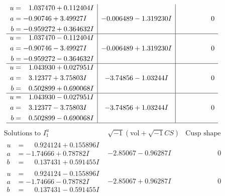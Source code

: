 \documentclass[1p]{elsarticle_modified}
\theoremstyle{definition}
\newcommand{\I}{\sqrt{-1}}
\begin{document}
$$\begin{array}{c|c|c}
\begin{aligned}
u &= \phantom{-}1.037470 + 0.112404 I \\
a &= -0.90746 + 3.49927 I \\
b &= -0.959272 + 0.364632 I\end{aligned}
 & -0.006489 - 1.319230 I & \phantom{-0.000000 } 0 \\ \hline\begin{aligned}
u &= \phantom{-}1.037470 - 0.112404 I \\
a &= -0.90746 - 3.49927 I \\
b &= -0.959272 - 0.364632 I\end{aligned}
 & -0.006489 + 1.319230 I & \phantom{-0.000000 } 0 \\ \hline\begin{aligned}
u &= \phantom{-}1.043930 + 0.027951 I \\
a &= \phantom{-}3.12377 + 3.75803 I \\
b &= \phantom{-}0.502899 + 0.690068 I\end{aligned}
 & -3.74856 - 1.03244 I & \phantom{-0.000000 } 0 \\ \hline\begin{aligned}
u &= \phantom{-}1.043930 - 0.027951 I \\
a &= \phantom{-}3.12377 - 3.75803 I \\
b &= \phantom{-}0.502899 - 0.690068 I\end{aligned}
 & -3.74856 + 1.03244 I & \phantom{-0.000000 } 0\\
 \hline 
 \end{array}$$\newpage$$\begin{array}{c|c|c}  
\text{Solutions to }I^u_{1}& \I (\text{vol} + \sqrt{-1}CS) & \text{Cusp shape}\\
 \hline 
\begin{aligned}
u &= \phantom{-}0.924124 + 0.155896 I \\
a &= -1.74666 + 0.78782 I \\
b &= \phantom{-}0.137431 + 0.591455 I\end{aligned}
 & -2.85067 - 0.96287 I & \phantom{-0.000000 } 0 \\ \hline\begin{aligned}
u &= \phantom{-}0.924124 - 0.155896 I \\
a &= -1.74666 - 0.78782 I \\
b &= \phantom{-}0.137431 - 0.591455 I\end{aligned}
 & -2.85067 + 0.96287 I & \phantom{-0.000000 } 0 \\ \hline\begin{aligned}

\end{aligned}
\end{array}$$
\end{document}
